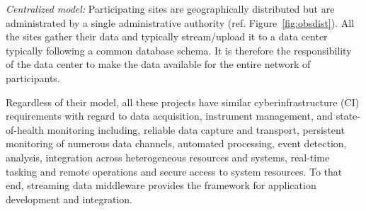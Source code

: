 \emph{Centralized model:} Participating sites are geographically distributed but are administrated by a single administrative authority (ref. Figure~\ref{fig:obsdist}). All the sites gather their data and typically stream/upload it to a data center typically following a common database schema. It is therefore the responsibility of the data center to make the data available for the entire network of participants.

Regardless of their model, all these projects have similar cyberinfrastructure (CI) requirements with regard to data acquisition, instrument management, and state-of-health monitoring including, reliable data capture and transport, persistent monitoring of numerous data channels, automated processing, event detection, analysis, integration across heterogeneous resources and systems, real-time tasking and remote operations and secure access to system resources. To that end, streaming data middleware provides the framework for application development and integration.

